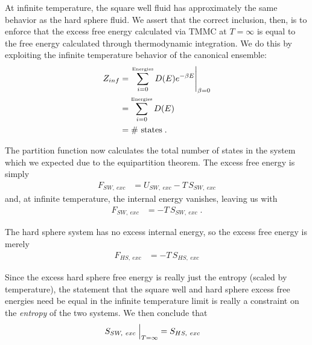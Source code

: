 \documentclass[12pt]{article}
\begin{document}
At infinite temperature, the square well fluid has approximately the same behavior as the hard sphere fluid.  We assert that the correct inclusion, then, is to enforce that the excess free energy calculated via TMMC at $T=\infty$ is equal to the free energy calculated through thermodynamic integration. We do this by exploiting the infinite temperature behavior of the canonical ensemble:
\begin{align}
    Z_{inf} &= \left.\sum_{i=0}^{\text{\tiny Energies}} D(E) e^{-\beta E}\right|_{\beta = 0}\\
    &= \sum_{i=0}^{\text{\tiny Energies}} D(E)\\
    &= \#\text{~states}\;.
\end{align}

The partition function now calculates the total number of states in the system which we expected due to the equipartition theorem. The excess free energy is simply
\begin{align*}
    F_{SW,~exc} &= U_{SW,~exc} - T\,S_{SW,~exc}     
\end{align*} 
and, at infinite temperature, the internal energy vanishes, leaving us with
\begin{align}
    F_{SW,~exc} &= -T\,S_{SW, ~exc} \;.
\end{align}

The hard sphere system has no excess internal energy, so the excess free energy is merely
\begin{align*}
     F_{HS,~exc} &= -T\,S_{HS,~exc} 
\end{align*} 

Since the excess hard sphere free energy is really just the entropy \cite{valeskethesis} (scaled by temperature), the statement that the square well and hard sphere excess free energies need be equal in the infinite temperature limit is really a constraint on the {\it entropy} of the two systems. We then conclude that
\begin{align*}
    S_{SW,~exc} \Bigm\lvert_{T=\infty} &= S_{HS,~exc}
\end{align*}
\end{document}
